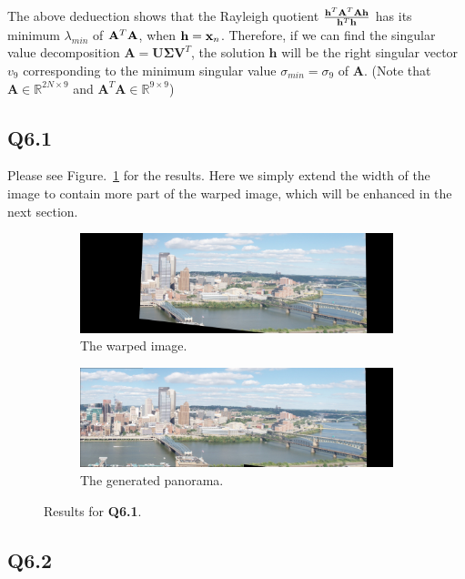 \documentclass[11pt]{article}
\begin{document}
The above deduection shows that the Rayleigh quotient $\frac{\mathbf{h}^T\mathbf{A}^T\mathbf{A}\mathbf{h}}{\mathbf{h}^T\mathbf{h}}$ has its minimum $\lambda_{min}$ of $\mathbf{A}^T \mathbf{A}$, when $\mathbf{h}=\mathbf{x}_n$. Therefore, if we can find the singular value decomposition $\mathbf{A} = \mathbf{U\Sigma V}^T$, the solution $\mathbf{h}$ will be the right singular vector $v_9$ corresponding to the minimum singular value $\sigma_{min}=\sigma_9$ of $\mathbf{A}$.
(Note that $\mathbf{A}\in \mathbb{R}^{2N\times 9}$ and $\mathbf{A}^T\mathbf{A}\in \mathbb{R}^{9\times 9}$)

\newpage

\subsection*{Q6.1}

Please see Figure.~\ref{fig:q6.1} for the results. Here we simply extend the width of the image to contain more part of the warped image, which will be enhanced in the next section.

\begin{figure}[h!]
    \begin{subfigure}{\textwidth}
      \centering
      \includegraphics[width=.8\linewidth]{../results/q6_1_warp.jpg}
      \caption{The warped image. }
    \end{subfigure}
    \begin{subfigure}{\textwidth}
      \centering
      \includegraphics[width=.8\linewidth]{../results/q6_1_pan.jpg}
      \caption{The generated panorama. }
    \end{subfigure}
    \caption{Results for \textbf{Q6.1}. }
    \label{fig:q6.1}
\end{figure}

\newpage

\subsection*{Q6.2}
\end{document}
